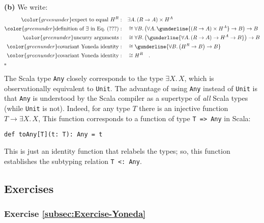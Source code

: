 \textbf{(b)} We write:
\begin{align*}
{\color{greenunder}\text{expect to equal }H^{R}:}\quad & \exists A.\,(R\rightarrow A)\times H^{A}\\
{\color{greenunder}\text{definition of }\exists\text{ in Eq.~}(???):}\quad & \cong\forall B.\,\big(\forall A.\,\gunderline{(R\rightarrow A)\times H^{A}}\rightarrow B\big)\rightarrow B\\
{\color{greenunder}\text{uncurry arguments}:}\quad & \cong\forall B.\,\big(\gunderline{\forall A.\,(R\rightarrow A)\rightarrow H^{A}\rightarrow B}\big)\rightarrow B\\
{\color{greenunder}\text{covariant Yoneda identity}:}\quad & \cong\gunderline{\forall B.\,\big(H^{R}\rightarrow B\big)\rightarrow B}\\
{\color{greenunder}\text{covariant Yoneda identity}:}\quad & \cong H^{R}\quad.
\end{align*}
$\square$

The Scala type \lstinline!Any!
closely corresponds to the type $\exists X.\,X$, which is observationally
equivalent to \lstinline!Unit!.
The advantage of using \lstinline!Any!
instead of \lstinline!Unit!
is that \lstinline!Any!
is understood by the Scala compiler as a supertype of \emph{all} Scala
types (while \lstinline!Unit!
is not). Indeed, for any type $T$ there is an injective function
$T\rightarrow\exists X.\,X$, This function corresponds to a function
of type \lstinline!T => Any!
in Scala:
\begin{lstlisting}
def toAny[T](t: T): Any = t
\end{lstlisting}
 This is just an identity function that relabels the types; so, this
function establishes the subtyping relation \lstinline!T <: Any!.

\subsection{Exercises}

\subsubsection{Exercise \label{subsec:Exercise-Yoneda}\ref{subsec:Exercise-Yoneda}}

